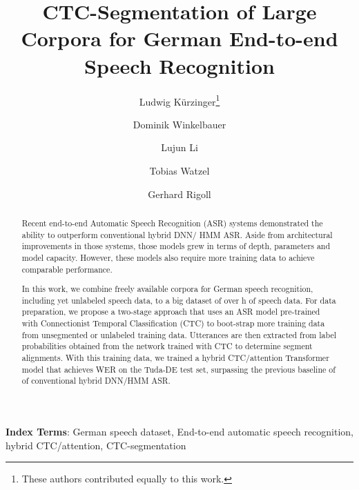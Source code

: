 \documentclass[runningheads]{llncs}
\begin{document}
\newcommand*\samethanks[1][\value{footnote}]{\footnotemark[#1]}
\title{CTC-Segmentation of Large Corpora for German End-to-end Speech Recognition}
\author{ Ludwig K{\"u}rzinger\thanks{These authors contributed equally to this work.} \and
	Dominik Winkelbauer\samethanks \and
	Lujun Li \and
Tobias Watzel \and
Gerhard Rigoll}


\maketitle
\begin{abstract}
Recent end-to-end Automatic Speech Recognition (ASR) systems demonstrated the ability to outperform conventional hybrid DNN/ HMM ASR.
Aside from architectural improvements in those systems, those models grew in terms of depth, parameters and model capacity.
However, these models also require more training data to achieve comparable performance.

In this work, we combine freely available corpora for German speech recognition, including yet unlabeled speech data, to a big dataset of over h of speech data.
For data preparation, we propose a two-stage approach that uses an ASR model pre-trained with Connectionist Temporal Classification (CTC) to boot-strap more training data from unsegmented or unlabeled training data.
Utterances are then extracted from label probabilities obtained from the network trained with CTC to determine segment alignments.
With this training data, we trained a hybrid CTC/attention Transformer model that achieves  WER on the Tuda-DE test set,
surpassing the previous baseline of  of conventional hybrid DNN/HMM ASR.
\end{abstract}
\noindent\textbf{Index Terms}: German speech dataset, End-to-end automatic speech recognition, hybrid CTC/attention, CTC-segmentation
\end{document}
